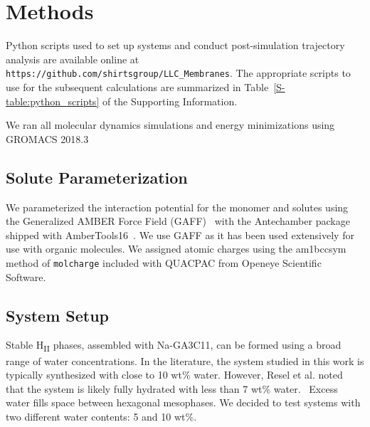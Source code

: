 \documentclass[journal=jpcbfk,manuscript=article]{achemso}
\begin{document}
  \section{Methods}
  
  Python scripts used to set up systems and conduct post-simulation trajectory 
  analysis are available online at \texttt{https://github.com/shirtsgroup/LLC\_Membranes}. 
  The appropriate scripts to use for the subsequent calculations are summarized in 
  Table~\ref{S-table:python_scripts} of the Supporting Information.
  
  We ran all molecular dynamics simulations and energy minimizations using GROMACS 2018.3 \cite{bekker_gromacs:_1993,berendsen_gromacs:_1995,van_der_spoel_gromacs:_2005,hess_gromacs_2008} 
  
  \subsection{Solute Parameterization}\label{method:parameterization}
  
  We parameterized the interaction potential for the monomer and solutes using 
  the Generalized AMBER Force Field (GAFF)~\cite{wang_development_2004} with the
  Antechamber package \cite{wang_automatic_2006} shipped with AmberTools16~\cite{case_ambertools16_2016}.
  We use GAFF as it has been used extensively for use with organic molecules.
  We assigned atomic charges using the am1bccsym method of \texttt{molcharge} included
  with QUACPAC from Openeye Scientific Software.
  
  \subsection{System Setup}\label{method:system_setup}

  Stable H\textsubscript{II} phases, assembled with Na-GA3C11, can be formed
  using a broad range of water concentrations. In the literature, the system 
  studied in this work is typically synthesized with close to 10 wt\% water.
  \cite{smith_ordered_1997, zhou_new_2007} However, Resel et al. noted that the
  system is likely fully hydrated with less than 7 wt\% water.~\cite{resel_h2-phase_2000}
  Excess water fills space between hexagonal mesophases. We decided to test 
  systems with two different water contents: 5 and 10 wt\%.
\end{document}
